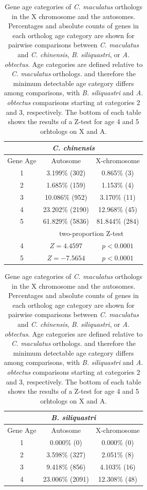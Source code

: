 \documentclass{article}
\begin{document}
\begin{table}[H]
    \centering
    \caption{Gene age categories of \textit{C. maculatus} orthologs in the X chromosome and the autosomes. 
    Percentages and absolute counts of genes in each ortholog age category are shown for pairwise comparisons between 
    \textit{C. maculatus} and \textit{C. chinensis}, \textit{B. siliquastri}, or \textit{A. obtectus}. 
    Age categories are defined relative to \textit{C. maculatus} orthologs. and therefore the minimum detectable age category differs among comparisons, 
    with \textit{B. siliquastri} and \textit{A. obtectus} comparisons starting at categories 2 and 3, respectively. 
    The bottom of each table shows the results of a Z-test for age 4 and 5 orhtologs on X and A.}
    \label{SItab:conservation}
    \begin{tabular}{c |c | c}
        \multicolumn{3}{c}{\textit{C. chinensis}}\\
        \hline
        Gene Age & Autosome & X-chromosome \\
        \hline
        \hline
        1 & 3.199\% (302) & 0.865\% (3)\\
        \hline
        2 & 1.685\% (159) & 1.153\% (4)\\
        \hline
        3 & 10.086\% (952) & 3.170\% (11)\\
        \hline
        4 & 23.202\% (2190) & 12.968\% (45)\\
        \hline
        5 & 61.829\% (5836) & 81.844\% (284)\\
        \hline
        \hline
        & \multicolumn{2}{c}{two-proportion Z-test}\\
        \hline
        4 & $Z = 4.4597$ & $p < 0.0001$ \\
        \hline
        5 & $Z = -7.5654$ & $p < 0.0001$ \\
    \end{tabular}
    \hspace{1cm}
    \begin{tabular}{c |c | c}
        \multicolumn{3}{c}{\textit{B. siliquastri}}\\
        \hline
        Gene Age & Autosome & X-chromosome \\
        \hline
        \hline
        1 & 0.000\% (0) & 0.000\% (0)\\
        \hline
        2 & 3.598\% (327) & 2.051\% (8)\\
        \hline
        3 & 9.418\% (856) & 4.103\% (16)\\
        \hline
        4 & 23.006\% (2091) & 12.308\% (48)\\

\end{tabular}
\end{table}
\end{document}

